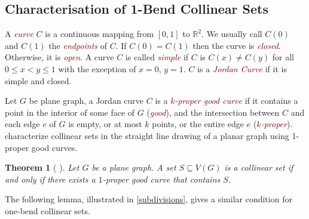 \documentclass[a4paper,UKenglish,cleveref, autoref, thm-restate]{lipics-v2021}
\newtheorem{thm}{Theorem}
\newcommand{\defin}[1]{\emph{\textcolor{Maroon}{#1}}}
\begin{document}

\subsection{Characterisation of 1-Bend Collinear Sets}
A \defin{curve} $C$ is a continuous mapping from $[0, 1]$ to $\mathbb{R}^2$. We usually call $C(0)$ and $C(1)$ the \defin{endpoints} of $C$. If $C(0)=C(1)$ then  the curve is \defin{closed}. Otherwise, it is \defin{open}. A curve $C$ is called \defin{simple} if $C$ is $C(x) \neq C(y)$ for all $0\le x<y\le 1$ with the exception of $x=0$, $y=1$. $C$ is a \defin{Jordan Curve} if it is simple and closed.

Let $G$ be plane graph, a Jordan curve $C$ is a \defin{$k$-proper good curve} if it contains a point in the interior of some face of $G$ (\defin{good}), and the intersection between $C$ and each edge $e$ of $G$ is empty, or at most $k$ points, or the entire edge $e$ (\defin{$k$-proper}). \citet{DBLP:journals/jocg/LozzoDFMR18} characterize collinear sets in the straight line drawing of a planar graph using 1-proper good curves.

\begin{thm}[\cite{DBLP:journals/jocg/LozzoDFMR18} ] \label{straightline-topological}
Let $G$ be a plane graph. A set $S \subseteq V(G)$ is a collinear set if and only if there exists a $1$-proper good curve that contains $S$.
\end{thm}

The following lemma, illustrated in \cref{subdivisions}, gives a similar condition for one-bend collinear sets.
\end{document}
